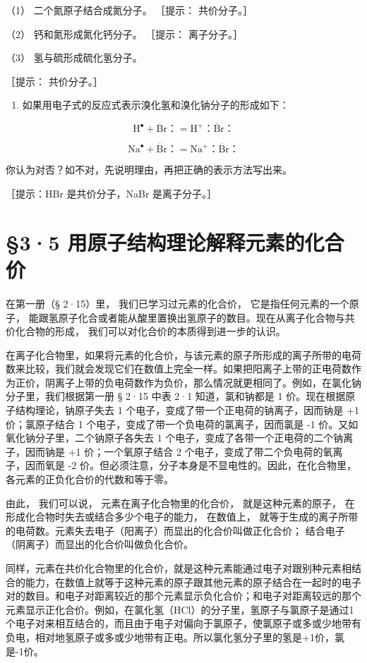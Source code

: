 （1） 二个氮原子结合成氮分子。 ［提示： 共价分子。］

（2） 钙和氮形成氮化钙分子。 ［提示： 离子分子。］

（3） 氢与硫形成硫化氢分子。

［提示： 共价分子。］

\begin{enumerate}[start=10]
\item
  如果用电子式的反应式表示溴化氢和溴化钠分子的形成如下：
\end{enumerate}

\[
\mathrm{H} ^ {\bullet} + \dot {\mathrm{Br}} \text{：}= \mathrm{H} ^ {+}\text{：} \dot {\mathrm{Br}}\text{：}
\]

\[
\mathrm{Na} ^ {\bullet} + \dot {\mathrm{Br}} \text{：}= \mathrm{Na} ^ {+}\text{：} \dot {\mathrm{Br}}\text{：}
\]

你认为对否？如不对，先说明理由，再把正确的表示方法写出来。

［提示：HBr 是共价分子，NaBr 是离子分子。］

\section{§3·5 用原子结构理论解释元素的化合价}

在第一册（§ 2·15）里， 我们已学习过元素的化合价，
它是指任何元素的一个原子，
能跟氢原子化合或者能从酸里置换出氢原子的数目。现在从离子化合物与共价化合物的形成，
我们可以对化合价的本质得到进一步的认识。

在离子化合物里，如果将元素的化合价，与该元素的原子所形成的离子所带的电荷数来比较，我们就会发现它们在数值上完全一样。如果把阳离子上带的正电荷数作为正价，阴离子上带的负电荷数作为负价，那么情况就更相同了。例如，在氯化钠分子里，我们根据第一册
§ 2·15 中表 2·1 知道，氯和钠都是 1 价。现在根据原子结构理论，钠原子失去
1 个电子，变成了带一个正电荷的钠离子，因而钠是 +1 价；氯原子结合 1
个电子，变成了带一个负电荷的氯离子，因而氯是 -1
价。又如氧化钠分子里，二个钠原子各失去 1
个电子，变成了各带一个正电荷的二个钠离子，因而钠是 +1 价；一个氧原子结合
2 个电子，变成了带二个负电荷的氧离子，因而氧是 -2
价。但必须注意，分子本身是不显电性的。因此，在化合物里，各元素的正负化合价的代数和等于零。

由此， 我们可以说， 元素在离子化合物里的化合价， 就是这种元素的原子，
在形成化合物时失去或结合多少个电子的能力， 在数值上，
就等于生成的离子所带的电荷数。元素失去电子（阳离子）而显出的化合价叫做正化合价；
结合电子（阴离子）而显出的化合价叫做负化合价。

同样，元素在共价化合物里的化合价，就是这种元素能通过电子对跟别种元素相结合的能力，在数值上就等于这种元素的原子跟其他元素的原子结合在一起时的电子对的数目。和电子对距离较近的那个元素显示负化合价；和电子对距离较远的那个元素显示正化合价。例如，在氯化氢（HCl）的分子里，氢原子与氯原子是通过1个电子对来相互结合的，而且由于电子对偏向于氯原子，使氯原子或多或少地带有负电，相对地氢原子或多或少地带有正电。所以氯化氢分子里的氢是+1价，氯是-1价。

